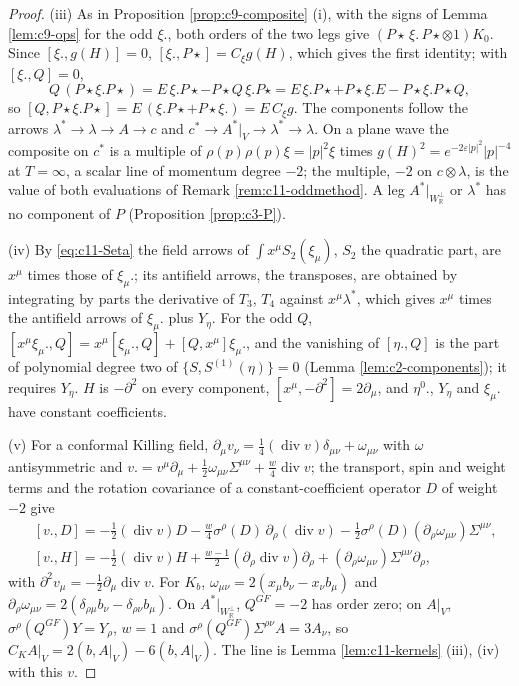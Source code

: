 \begin{proof}
(iii) As in Proposition \ref{prop:c9-composite} (i), with the signs of Lemma \ref{lem:c9-ops} for the odd $\xi.$, both orders of the two legs give $(P\star\,\xi.\,P\star\otimes1)K_0$. Since $[\xi.,g(H)]=0$, $[\xi.,P\star]=C_\xi g(H)$, which gives the first identity; with $[\xi.,Q]=0$,
\[
Q\,(P\star\xi.P\star)=E\,\xi.P\star-P\star Q\,\xi.P\star=E\,\xi.P\star+P\star\xi.E-P\star\xi.P\star Q,
\]
so $[Q,P\star\xi.P\star]=E\,(\xi.P\star+P\star\xi.)=E\,C_\xi g$. The components follow the arrows $\lambda^*\to\lambda\to A\to c$ and $c^*\to A^*|_V\to\lambda^*\to\lambda$. On a plane wave the composite on $c^*$ is a multiple of $\rho(p)\rho(p)\xi=|p|^2\xi$ times $g(H)^2=e^{-2\varepsilon|p|^2}|p|^{-4}$ at $T=\infty$, a scalar line of momentum degree $-2$; the multiple, $-2$ on $c\otimes\lambda$, is the value of both evaluations of Remark \ref{rem:c11-oddmethod}. A leg $A^*|_{W_{\mathbb R}^\perp}$ or $\lambda^*$ has no component of $P$ (Proposition \ref{prop:c3-P}).

(iv) By \eqref{eq:c11-Seta} the field arrows of $\int x^\mu S_2(\xi_\mu)$, $S_2$ the quadratic part, are $x^\mu$ times those of $\xi_\mu.$; its antifield arrows, the transposes, are obtained by integrating by parts the derivative of $T_3$, $T_4$ against $x^\mu\lambda^*$, which gives $x^\mu$ times the antifield arrows of $\xi_\mu.$ plus $Y_\eta$. For the odd $Q$, $[x^\mu\xi_\mu.,Q]=x^\mu[\xi_\mu.,Q]+[Q,x^\mu]\xi_\mu.$, and the vanishing of $[\eta.,Q]$ is the part of polynomial degree two of $\{S,S^{(1)}(\eta)\}=0$ (Lemma \ref{lem:c2-components}); it requires $Y_\eta$. $H$ is $-\partial^2$ on every component, $[x^\mu,-\partial^2]=2\partial_\mu$, and $\eta^0.$, $Y_\eta$ and $\xi_\mu.$ have constant coefficients.

(v) For a conformal Killing field, $\partial_\mu v_\nu=\tfrac14(\operatorname{div}v)\delta_{\mu\nu}+\omega_{\mu\nu}$ with $\omega$ antisymmetric and $v.=v^\mu\partial_\mu+\tfrac12\omega_{\mu\nu}\Sigma^{\mu\nu}+\tfrac w4\operatorname{div}v$; the transport, spin and weight terms and the rotation covariance of a constant-coefficient operator $D$ of weight $-2$ give
\[
\begin{aligned}
&[v.,D]=-\tfrac12(\operatorname{div}v)D-\tfrac w4\sigma^\rho(D)\,\partial_\rho(\operatorname{div}v)-\tfrac12\sigma^\rho(D)(\partial_\rho\omega_{\mu\nu})\Sigma^{\mu\nu},\\
&[v.,H]=-\tfrac12(\operatorname{div}v)H+\tfrac{w-1}2(\partial_\rho\operatorname{div}v)\partial_\rho+(\partial_\rho\omega_{\mu\nu})\Sigma^{\mu\nu}\partial_\rho,
\end{aligned}
\]
with $\partial^2v_\mu=-\tfrac12\partial_\mu\operatorname{div}v$. For $K_b$, $\omega_{\mu\nu}=2(x_\mu b_\nu-x_\nu b_\mu)$ and $\partial_\rho\omega_{\mu\nu}=2(\delta_{\rho\mu}b_\nu-\delta_{\rho\nu}b_\mu)$. On $A^*|_{W_{\mathbb R}^\perp}$, $Q^{GF}=-2$ has order zero; on $A|_V$, $\sigma^\rho(Q^{GF})Y=Y_\rho$, $w=1$ and $\sigma^\rho(Q^{GF})\Sigma^{\rho\nu}A=3A_\nu$, so $C_KA|_V=2(b,A|_V)-6(b,A|_V)$. The line is Lemma \ref{lem:c11-kernels} (iii), (iv) with this $v$.
\end{proof}

